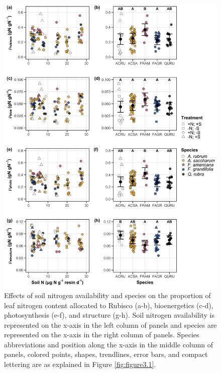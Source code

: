 \newpage
\begin{figure}
    \includegraphics[scale = 0.049]{ch3_NxpH/figs/NxS_fig3_leafn_allocation.png}
    \centering
    \caption[Effects of soil nitrogen availability, species, and leaf nitrogen content on the fraction of leaf nitrogen allocated to photosynthesis and structure]{Effects of soil nitrogen availability and species on the proportion of leaf nitrogen content allocated to Rubisco (a-b), bioenergetics (c-d), photosynthesis (e-f), and structure (g-h). Soil nitrogen availability is represented on the x-axis in the left column of panels and species are represented on the x-axis in the right column of panels. Species abbreviations and position along the x-axis in the middle column of panels, colored points, shapes, trendlines, error bars, and compact lettering are as explained in Figure \ref{fig:figure3.1}.}
    \label{fig:figure3.3}
    \end{figure}
\clearpage

\newpage

